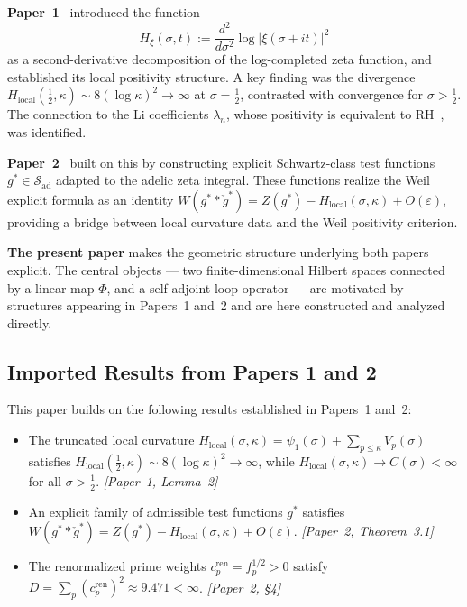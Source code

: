 \documentclass[11pt]{article}
\newcommand{\Hlocal}{H_{\mathrm{local}}}
\newcommand{\cren}{c_p^{\mathrm{ren}}}
\begin{document}
\textbf{Paper~1}~\cite{Paper1} introduced the function
\[
H_{\xi}(\sigma,t) := \frac{d^2}{d\sigma^2}\log|\xi(\sigma+it)|^2
\]
as a second-derivative decomposition of the log-completed zeta function, and
established its local positivity structure. A key finding was the divergence
$\Hlocal(\tfrac12,\kappa)\sim 8(\log\kappa)^2\to\infty$ at $\sigma=\tfrac12$,
contrasted with convergence for $\sigma>\tfrac12$. The connection to the Li
coefficients $\lambda_n$, whose positivity is equivalent to RH~\cite{Li97},
was identified.

\textbf{Paper~2}~\cite{Paper2} built on this by constructing explicit
Schwartz-class test functions $g^*\in\mathcal{S}_{\mathrm{ad}}$ adapted
to the adelic zeta integral. These functions realize the Weil explicit formula
as an identity
$W(g^*\ast\check{g}^*)=Z(g^*)-\Hlocal(\sigma,\kappa)+O(\varepsilon)$,
providing a bridge between local curvature data and the Weil positivity
criterion.

\textbf{The present paper} makes the geometric structure underlying both
papers explicit. The central objects --- two finite-dimensional Hilbert spaces
connected by a linear map $\Phi$, and a self-adjoint loop operator ---
are motivated by structures appearing in Papers~1 and~2 and are here
constructed and analyzed directly.

\subsection{Imported Results from Papers 1 and 2}
\label{sec:imported}

This paper builds on the following results established in Papers~1 and~2:

\begin{itemize}[leftmargin=2.2em]
\item[\textbf{(R1)}] The truncated local curvature
$\Hlocal(\sigma,\kappa)=\psi_1(\sigma)+\sum_{p\le\kappa}V_p(\sigma)$ satisfies
$\Hlocal(\tfrac12,\kappa)\sim 8(\log\kappa)^2\to\infty$, while
$\Hlocal(\sigma,\kappa)\to C(\sigma)<\infty$ for all $\sigma>\tfrac12$.
\emph{[Paper~1, Lemma~2]}

\item[\textbf{(R2)}] An explicit family of admissible test functions $g^*$
satisfies
$W(g^*\ast\check{g}^*)=Z(g^*)-\Hlocal(\sigma,\kappa)+O(\varepsilon)$.
\emph{[Paper~2, Theorem~3.1]}

\item[\textbf{(R3)}] The renormalized prime weights $\cren=f_p^{1/2}>0$ satisfy
$D=\sum_p(\cren)^2\approx 9.471<\infty$. \emph{[Paper~2, \S4]}
\end{itemize}
\end{document}

